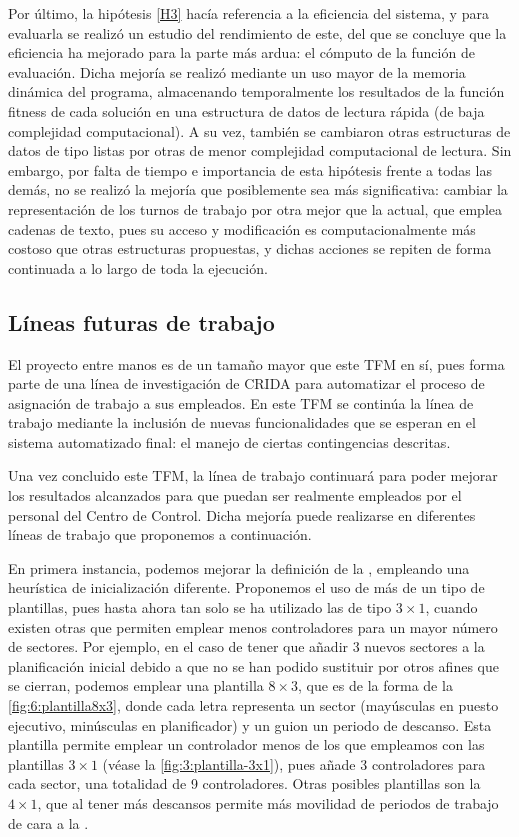 Por último, la hipótesis \ref{H3} hacía referencia a la eficiencia del sistema, y para evaluarla se realizó un estudio del rendimiento de este, del que se concluye que la eficiencia ha mejorado para la parte más ardua: el cómputo de la función de evaluación. Dicha mejoría se realizó mediante un uso mayor de la memoria dinámica del programa, almacenando temporalmente los resultados de la función fitness de cada solución en una estructura de datos de lectura rápida (de baja complejidad computacional). A su vez, también se cambiaron otras estructuras de datos de tipo listas por otras de menor complejidad computacional de lectura. Sin embargo, por falta de tiempo e importancia de esta hipótesis frente a todas las demás, no se realizó la mejoría que posiblemente sea más significativa: cambiar la representación de los turnos de trabajo por otra mejor que la actual, que emplea cadenas de texto, pues su acceso y modificación es computacionalmente más costoso que otras estructuras propuestas, y dichas acciones se repiten de forma continuada a lo largo de toda la ejecución.

\subsection{Líneas futuras de trabajo}
\label{sec:6:trabajo-futuro}

El proyecto entre manos es de un tamaño mayor que este TFM en sí, pues forma parte de una línea de investigación de \gls{CRIDA} para automatizar el proceso de asignación de trabajo a sus empleados. En este TFM se continúa la línea de trabajo mediante la inclusión de nuevas funcionalidades que se esperan en el sistema automatizado final: el manejo de ciertas contingencias descritas.

Una vez concluido este TFM, la línea de trabajo continuará para poder mejorar los resultados alcanzados para que puedan ser realmente empleados por el personal del Centro de Control. Dicha mejoría puede realizarse en diferentes líneas de trabajo que proponemos a continuación.

En primera instancia, podemos mejorar la definición de la \faseuno{}, empleando una heurística de inicialización diferente. Proponemos el uso de más de un tipo de plantillas, pues hasta ahora tan solo se ha utilizado las de tipo $3\times1$, cuando existen otras que permiten emplear menos controladores para un mayor número de sectores. Por ejemplo, en el caso de tener que añadir 3 nuevos sectores a la planificación inicial debido a que no se han podido sustituir por otros afines que se cierran, podemos emplear una plantilla $8\times3$, que es de la forma de la \autoref{fig:6:plantilla8x3}, donde cada letra representa un sector (mayúsculas en puesto ejecutivo, minúsculas en planificador) y un guion un periodo de descanso. Esta plantilla permite emplear un controlador menos de los que empleamos con las plantillas $3\times1$ (véase la \autoref{fig:3:plantilla-3x1}), pues añade 3 controladores para cada sector, una totalidad de 9 controladores. Otras posibles plantillas son la $4\times1$, que al tener más descansos permite más movilidad de periodos de trabajo de cara a la \fasedos{}. %

